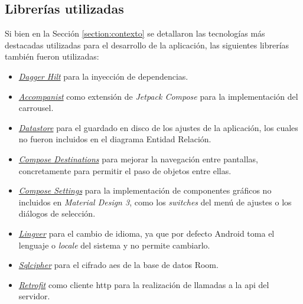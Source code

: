                 \clearpage  %
        
        \subsection{Librerías utilizadas}
            \label{section:implementacion:librerias_app}
            Si bien en la Sección \ref{section:contexto} se detallaron las tecnologías más destacadas utilizadas para el desarrollo de la aplicación, las siguientes librerías también fueron utilizadas:
            \begin{itemize}
                \item \href{https://developer.android.com/training/dependency-injection/hilt-android}{\textit{Dagger Hilt}} para la inyección de dependencias.
                \item \href{https://github.com/google/accompanist}{\textit{Accompanist}} como extensión de \textit{Jetpack Compose} para la implementación del carrousel.
                \item \href{https://developer.android.com/topic/libraries/architecture/datastore}{\textit{Datastore}} para el guardado en disco de los ajustes de la aplicación, los cuales no fueron incluidos en el diagrama Entidad Relación.
                \item \href{https://github.com/raamcosta/compose-destinations}{\textit{Compose Destinations}} para mejorar la navegación entre pantallas, concretamente para permitir el paso de objetos entre ellas.
                \item \href{https://github.com/alorma/Compose-Settings}{\textit{Compose Settings}} para la implementación de componentes gráficos no incluidos en \textit{Material Design 3}, como los \textit{switches} del menú de ajustes o los diálogos de selección.
                \item \href{https://github.com/YarikSOffice/lingver}{\textit{Lingver}} para el cambio de idioma, ya que por defecto Android toma el lenguaje o \textit{locale} del sistema y no permite cambiarlo.
                \item \href{https://github.com/sqlcipher/android-database-sqlcipher}{\textit{Sqlcipher}} para el cifrado \gls{aes} de la base de datos Room.
                \item \href{https://github.com/square/retrofit}{\textit{Retrofit}} como cliente \gls{http} para la realización de llamadas a la \gls{api} del servidor.
            \end{itemize}
            \clearpage  %
